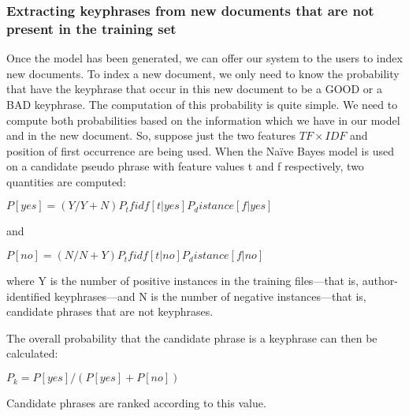 \subsubsection{Extracting keyphrases from new documents that are not present in the training set}
Once the model has been generated, we can offer our system to the
users to index new documents. To index a new document, we only need to
know the probability that have the keyphrase that occur in this new
document to be a GOOD or a BAD keyphrase. The computation of this
probability is quite simple. We need to compute both probabilities
based on the information which we have in our model and in the new
document. So, suppose just the two features $TF×IDF$ and position of
first occurrence are being used. When the Naïve Bayes model is used on
a candidate pseudo phrase with feature values t and f respectively,
two quantities are computed:

$P[ yes ] = (Y / Y + N) P_tfidf [ t | yes ]  P_distance[ f | yes ]$

and

$P[ no ] = (N / N + Y) P_tfidf [ t | no ]  P_distance[ f | no ]$

where Y is the number of positive instances in the training files—that
is, author-identified keyphrases—and N is the number of negative
instances—that is, candidate phrases that are not keyphrases.

The overall probability that the candidate phrase is a keyphrase can
then be calculated:

$P_k = P[ yes ] / (P[ yes ]+P[ no ])$

Candidate phrases are ranked according to this value.